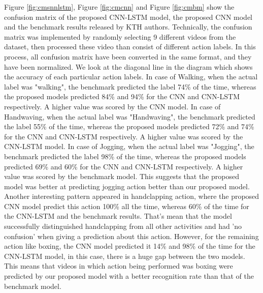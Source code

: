 Figure \ref{fig:cmsnnlstm}, Figure \ref{fig:cmcnn} and Figure \ref{fig:cmbm} show the confusion matrix of the proposed CNN-LSTM model, the proposed CNN model and the benchmark results released by KTH authors. Technically, the confusion matrix was implemented by randomly selecting 9 different videos from the dataset, then processed these video than consist of different action labels. In this process, all confusion matrix have been converted in the same format, and they have been normalized. We look at the diagonal line in the diagram which shows the accuracy of each particular action labels. In case of Walking, when the actual label was "walking", the benchmark predicted the label 74\% of the time, whereas the proposed models predicted 84\% and 94\% for the CNN and CNN-LSTM respectively. A higher value was scored by the CNN model. In case of Handwaving, when the actual label was "Handwaving", the benchmark predicted the label 55\% of the time, whereas the proposed models predicted 72\% and 74\% for the CNN and CNN-LSTM respectively. A higher value was scored by the CNN-LSTM model. In case of Jogging, when the actual label was "Jogging", the benchmark predicted the label 98\% of the time, whereas the proposed models predicted 69\% and 60\% for the CNN and CNN-LSTM respectively. A higher value was scored by the benchmark model. This suggests that the proposed model was better at predicting jogging action better than our proposed model. Another interesting pattern appeared in handclapping action, where the proposed CNN model predict this action 100\% all the time, whereas 60\% of the time for the CNN-LSTM and the benchmark results. That's mean that the model successfully distinguished handclapping from all other activities and had 'no confusion' when giving a prediction about this action. However, for the remaining action like boxing, the CNN model predicted it 14\% and 98\% of the time for the CNN-LSTM model, in this case, there is a huge gap between the two models. This means that videos in which action being performed was boxing were predicted by our proposed model with a better recognition rate than that of the benchmark model.\\

